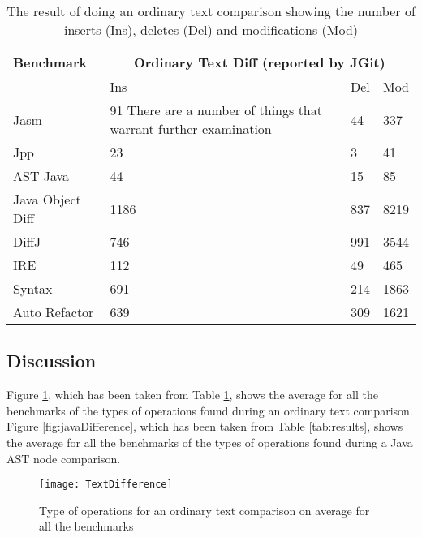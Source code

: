 \begin{table}[H]
    \centering
    \begin{tabular}{l|lll}
    Benchmark        & \multicolumn{3}{|c}{Ordinary Text Diff (reported by JGit)} \\ \hline
    ~                & Ins            & Del & Mod  \\ \hline
    Jasm             & 91       There are a number of things that warrant further examination       & 44  & 337  \\
    Jpp              & 23             & 3   & 41   \\
    AST Java         & 44             & 15  & 85   \\
    Java Object Diff & 1186           & 837 & 8219 \\
    DiffJ            & 746            & 991 & 3544 \\
    IRE              & 112            & 49  & 465  \\
    Syntax           & 691            & 214 & 1863 \\
    Auto Refactor    & 639            & 309 & 1621 \\
    \end{tabular}
    \caption{The result of doing an ordinary text comparison showing the number of inserts (Ins), deletes (Del) and modifications (Mod)}
    \label{tab:textcomp}
\end{table}



\subsection{Discussion}
Figure \ref{fig:textDifference}, which has been taken from Table \ref{tab:textcomp}, shows the average for all the benchmarks of the types of operations found during an ordinary text comparison.  
Figure \ref{fig:javaDifference}, which has been taken from Table \ref{tab:results}, shows the average for all the benchmarks of the types of operations found during a Java AST node comparison.

\begin{figure}[!t] 
 \begin{center}
 \texttt{[image: TextDifference]}
 \end{center}
 \caption{Type of operations for an ordinary text comparison on average for all the benchmarks}
 \label{fig:textDifference}
\end{figure}

